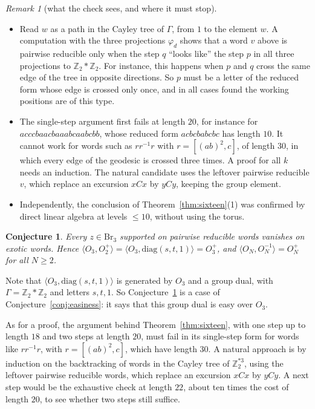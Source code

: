 \documentclass[11pt]{amsart}
\newtheorem{conjecture}[theorem]{Conjecture}
\theoremstyle{definition}
\theoremstyle{remark}
\newtheorem{remark}[theorem]{Remark}
\theoremstyle{plain}
\numberwithin{equation}{section}
\numberwithin{table}{section}
\newcommand{\Z}{\mathbb Z}
\newcommand{\Br}{\mathrm{Br}}
\begin{document}
\begin{remark}[what the check sees, and where it must stop]
\leavevmode
\begin{itemize}
\item Read $w$ as a path in the Cayley tree of $\Gamma$, from $1$ to the element $w$. A computation with the three
projections $\varphi_d$ shows that a word $v$ above is pairwise reducible only when the step $q$ ``looks like'' the step
$p$ in all three projections to $\Z_2*\Z_2$. For instance, this happens when $p$ and $q$ cross the same edge of the tree in
opposite directions. So $p$ must be a letter of the reduced form whose edge is crossed only once, and in all cases found
the working positions are of this type.
\item The single-step argument first fails at length $20$, for instance for $acccbaacbaaabcaabcbb$, whose reduced form $acbcbabcbc$ has length $10$. It cannot work for words such as $rr^{-1}r$ with $r=[(ab)^2,c]$, of length $30$, in
which every edge of the geodesic is crossed three times. A proof for all $k$ needs an induction. The natural candidate
uses the leftover pairwise reducible $v$, which replace an excursion $xCx$ by $yCy$, keeping the group element.
\item Independently, the conclusion of Theorem~\ref{thm:sixteen}(1) was confirmed by direct linear algebra at levels
$\le10$, without using the torus.
\end{itemize}
\end{remark}

\begin{conjecture}\label{conj:torus}
Every $z\in\Br_3$ supported on pairwise reducible words vanishes on exotic words. Hence
$\langle O_3,O_2^+\rangle=\langle O_3,\mathrm{diag}(s,t,1)\rangle=O_3^+$, and $\langle O_N,O_N^{-1}\rangle=O_N^+$ for all $N\ge2$.
\end{conjecture}

Note that $\langle O_3,\mathrm{diag}(s,t,1)\rangle$ is generated by $O_3$ and a group dual, with $\Gamma=\Z_2*\Z_2$ and
letters $s,t,1$. So Conjecture~\ref{conj:torus} is a case of Conjecture~\ref{conj:easiness}: it says that this group dual is easy over $O_3$.

As for a proof, the argument behind Theorem~\ref{thm:sixteen}, with one step up to length $18$ and two steps at length $20$, must fail in its single-step form for words like $rr^{-1}r$, with $r=[(ab)^2,c]$, which have length $30$. A natural approach is by induction on the backtracking of words in the Cayley tree of $\Z_2^{*3}$, using the leftover pairwise reducible words, which replace an excursion $xCx$ by $yCy$. A next step would be the exhaustive check at length $22$, about ten times the cost of length $20$, to see whether two steps still suffice.
\end{document}
